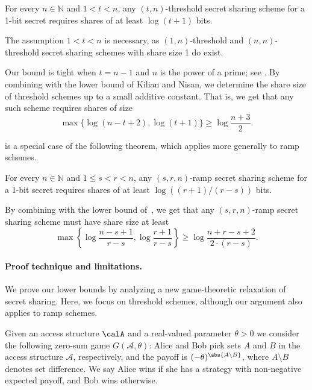 \documentclass{toc}
\begin{document}
\begin{theorem}	\label{cor:main}
For every $n\in\mathbb{N}$ and $1 < t < n$, any $(t,n)$-threshold secret 
sharing scheme for a
1-bit secret requires shares of at least $\log (t+1)$ bits.
\end{theorem}

The assumption $1 < t < n$ is necessary, as $(1, n)$-threshold and $(n, n)$-threshold secret sharing schemes with share size 1 do exist.

Our bound is tight when $t = n - 1$ and $n$ is the power of a prime; see
. By combining  with the lower
bound of Kilian and Nisan, we determine the share size of threshold schemes up
to a small additive constant.  That is, we get that any such scheme requires
shares of size
\begin{equation}
\label{eqn:combined}
\max\{\log(n-t+2), \log (t+1)\} \geq \log \frac{n+3}{2}.
\end{equation}

 is a special case of the following theorem, which applies more generally to ramp schemes. 
\begin{theorem}
	\label{thm:main}
	For every $n\in\mathbb{N}$ and $1 \leq s < r < n$, any $(s,r,n)$-ramp secret sharing scheme
	for a 1-bit secret requires shares of at least $\log ((r + 1)/(r-s))$ bits.
\end{theorem}
By combining  with the lower bound of~\cite{PueyoCX13}, we
get that any $(s,r,n)$-ramp secret sharing scheme must have share size at least
\begin{equation}
\label{eqn:combined_ramp}
\max\left\{\log\frac{n-s+1}{r-s}, \log \frac{r + 1}{r - s}\right\} \geq \log
\frac{n+r-s+2}{2\cdot (r-s)}.
\end{equation}

%
\paragraph{Proof technique and limitations.}
We prove our lower bounds by analyzing a new game-theoretic relaxation of secret
sharing. Here, we focus on threshold schemes, although our argument also applies to
ramp schemes.

Given an access structure $\calA$ and a real-valued parameter $\theta > 0$ we consider the following zero-sum game $G(\mathcal{A}, \theta)$:  Alice and Bob pick sets $A$ and $B$ in the access structure $\mathcal{A}$, respectively, and the payoff is $(-\theta)^{\abs{A \setminus B}}$, where $A \setminus B$ denotes set difference.  We say Alice wins if she has a strategy with non-negative expected payoff, and Bob wins otherwise.
\end{document}
